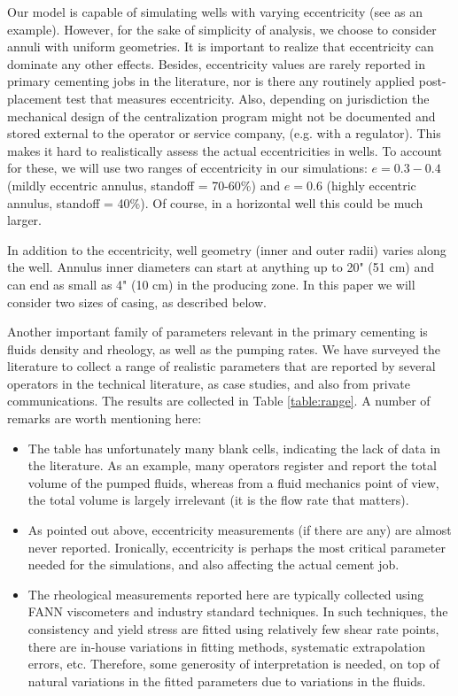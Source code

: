 \documentclass[review]{elsarticle}
\begin{document}
Our model \citep{Maleki2017} is capable of simulating wells with varying eccentricity (see \cite{Renteria2018b}  as an example). However, for the sake of simplicity of analysis, we choose to consider annuli with uniform geometries. It is important to realize that eccentricity can dominate any other effects. Besides, eccentricity values are rarely reported in primary cementing jobs in the literature, nor is there any routinely applied post-placement test that measures eccentricity. Also, depending on jurisdiction the mechanical design of the centralization program might not be documented and stored external to the operator or service company, (e.g. with a regulator). This makes it hard to realistically assess the actual eccentricities in wells.  To account for these, we will use two ranges of eccentricity in our simulations: $e = 0.3-0.4$ (mildly eccentric annulus, standoff = 70-60\%) and $e=0.6$ (highly eccentric annulus, standoff = 40\%). Of course, in a horizontal well this could be much larger.

In addition to the eccentricity, well geometry (inner and outer radii) varies along the well. Annulus inner diameters can start at anything up to 20" (51 cm) and can end as small as 4" (10 cm) in the producing zone. In this paper we will consider two sizes of casing, as described below.

Another important family of parameters relevant in the primary cementing is fluids density and rheology, as well as the pumping rates. We have surveyed the literature to collect a range of realistic parameters that are reported by several operators in the technical literature, as case studies, and also from private communications. The results are collected in Table \ref{table:range}. A number of remarks are worth mentioning here: 
\begin{itemize}
	\item The table has unfortunately many blank cells, indicating the lack of data in the literature. As an example, many operators register and report the total volume of the pumped fluids, whereas from a fluid mechanics point of view, the total volume is largely irrelevant (it is the flow rate that matters). 
	\item As pointed out above, eccentricity measurements (if there are any) are almost never reported. Ironically, eccentricity is perhaps the most critical parameter needed for the simulations, and also affecting the actual cement job. 
	\item The rheological measurements reported here are typically collected using FANN viscometers and industry standard techniques. In such techniques, the consistency and yield stress are fitted using relatively few shear rate points, there are in-house variations in fitting methods, systematic extrapolation errors, etc. Therefore, some generosity of interpretation is needed, on top of natural variations in the fitted parameters due to variations in the fluids.
\end{itemize}
\end{document}

